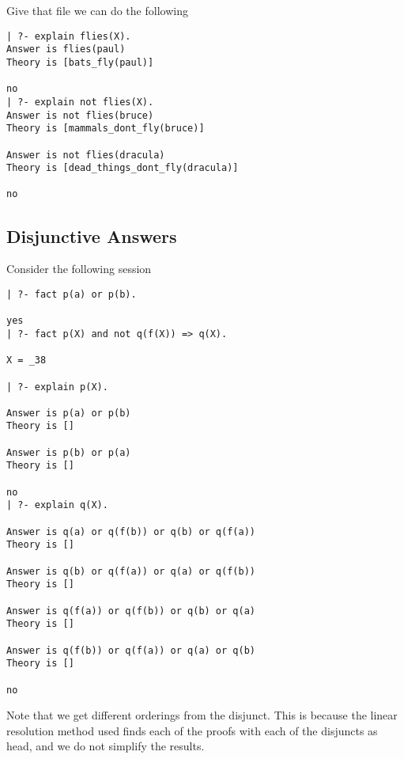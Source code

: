 Give that file we can do the following
\begin{verbatim}
| ?- explain flies(X).
Answer is flies(paul)
Theory is [bats_fly(paul)]

no
| ?- explain not flies(X).
Answer is not flies(bruce)
Theory is [mammals_dont_fly(bruce)]

Answer is not flies(dracula)
Theory is [dead_things_dont_fly(dracula)]

no
\end{verbatim}
\subsection{Disjunctive Answers}
Consider the following session
\begin{verbatim}
| ?- fact p(a) or p(b). 
 
yes
| ?- fact p(X) and not q(f(X)) => q(X).
 
X = _38 
 
| ?- explain p(X).

Answer is p(a) or p(b)
Theory is []
 
Answer is p(b) or p(a)
Theory is []

no
| ?- explain q(X).

Answer is q(a) or q(f(b)) or q(b) or q(f(a))
Theory is []

Answer is q(b) or q(f(a)) or q(a) or q(f(b))
Theory is []

Answer is q(f(a)) or q(f(b)) or q(b) or q(a)
Theory is []

Answer is q(f(b)) or q(f(a)) or q(a) or q(b)
Theory is []

no
\end{verbatim}

Note that we get different orderings from the disjunct. This is because the
linear resolution method used finds each of the proofs with each of the
disjuncts as head, and we do not simplify the results.
